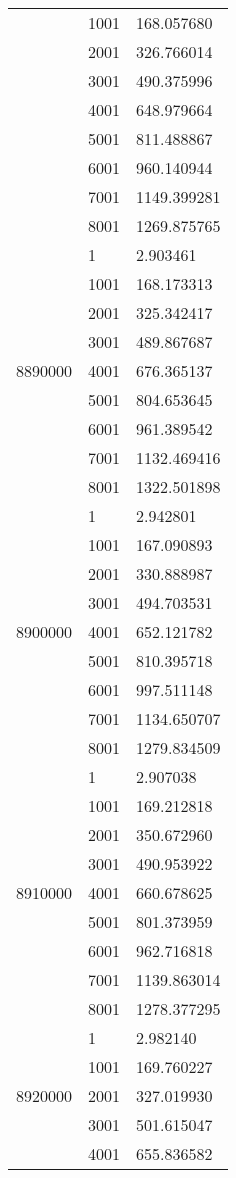 \begin{table}[htb!]
\begin{tabular}{lll}
 & 1001 & 168.057680 \\
 & 2001 & 326.766014 \\
 & 3001 & 490.375996 \\
 & 4001 & 648.979664 \\
 & 5001 & 811.488867 \\
 & 6001 & 960.140944 \\
 & 7001 & 1149.399281 \\
 & 8001 & 1269.875765 \\
\multirow[c]{9}{*}{8890000} & 1 & 2.903461 \\
 & 1001 & 168.173313 \\
 & 2001 & 325.342417 \\
 & 3001 & 489.867687 \\
 & 4001 & 676.365137 \\
 & 5001 & 804.653645 \\
 & 6001 & 961.389542 \\
 & 7001 & 1132.469416 \\
 & 8001 & 1322.501898 \\
\multirow[c]{9}{*}{8900000} & 1 & 2.942801 \\
 & 1001 & 167.090893 \\
 & 2001 & 330.888987 \\
 & 3001 & 494.703531 \\
 & 4001 & 652.121782 \\
 & 5001 & 810.395718 \\
 & 6001 & 997.511148 \\
 & 7001 & 1134.650707 \\
 & 8001 & 1279.834509 \\
\multirow[c]{9}{*}{8910000} & 1 & 2.907038 \\
 & 1001 & 169.212818 \\
 & 2001 & 350.672960 \\
 & 3001 & 490.953922 \\
 & 4001 & 660.678625 \\
 & 5001 & 801.373959 \\
 & 6001 & 962.716818 \\
 & 7001 & 1139.863014 \\
 & 8001 & 1278.377295 \\
\multirow[c]{9}{*}{8920000} & 1 & 2.982140 \\
 & 1001 & 169.760227 \\
 & 2001 & 327.019930 \\
 & 3001 & 501.615047 \\
 & 4001 & 655.836582 \\

\end{tabular}
\end{table}
